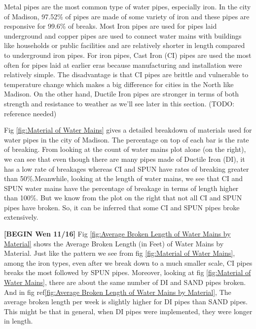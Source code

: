 \documentclass[twocolumn]{article}
\begin{document}
Metal pipes are the most common type of water pipes, especially iron. In the city of Madison, 97.52\% of pipes are made of some variety of iron and these pipes are responsive for 99.6\% of breaks.  Most Iron pipes are used for pipes laid underground and copper pipes are used to connect water mains with buildings like households or public facilities and are relatively shorter in length compared to underground iron pipes. For iron pipes, Cast Iron (CI) pipes are used the most often for pipes laid at earlier eras because manufacturing and installation were relatively simple. The disadvantage is that CI pipes are brittle and vulnerable to temperature change which makes a big difference for cities in the North like Madison. On the other hand, Ductile Iron pipes are stronger in terms of both strength and resistance to weather as we'll see later in this section. (TODO: reference needed)


Fig \ref{fig:Material of Water Mains} gives a detailed breakdown of materials used for water pipes  in the city of Madison. The percentage on top of each bar is the rate of breaking.  From looking at the count of water mains plot alone (on the right), we can see that even though there are many pipes made of  Ductile Iron (DI), it has a low rate of breakages whereas CI and SPUN have rates of breaking greater than 50\%.Meanwhile, looking at the length of water mains, we see that CI and SPUN water mains have the percentage of breakage in terms of length higher than 100\%. But we know from the plot on the right that not all CI and SPUN pipes have broken. So, it can be inferred that some CI and SPUN pipes broke extensively. 

 \textbf{[BEGIN Wen 11/16]} 
Fig \ref{fig:Average Broken Length of Water Mains by Material} shows the Average Broken Length (in Feet) of Water Mains by Material. Just like the pattern we see from fig \ref{fig:Material of Water Mains}, among the iron types, even after we break down to a much smaller scale, CI pipes breaks the most followed by SPUN pipes. Moreover, looking at fig \ref{fig:Material of Water Mains}, there are about the same number of DI and SAND pipes broken. And in fig ref\ref{fig:Average Broken Length of Water Mains by Material}, The average broken length per week is slightly higher for DI pipes than SAND pipes. This might be that in general, when DI pipes were implemented, they were longer in length. 
\end{document}
